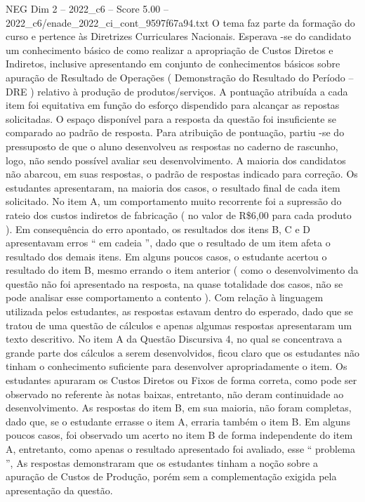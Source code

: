 \begin{textsample}{NEG Dim 2 – 2022\_c6 – Score 5.00 – 2022\_c6/enade\_2022\_ci\_cont\_9597f67a94.txt}
O tema faz parte da formação do curso e pertence às Diretrizes Curriculares Nacionais.
Esperava -se do candidato um conhecimento básico de como realizar a apropriação de Custos Diretos e Indiretos, inclusive apresentando em conjunto de conhecimentos básicos sobre apuração de Resultado de Operações ( Demonstração do Resultado do Período – DRE ) relativo à produção de produtos/serviços.
A pontuação atribuída a cada item foi equitativa em função do esforço dispendido para alcançar as repostas solicitadas.
O espaço disponível para a resposta da questão foi insuficiente se comparado ao padrão de resposta.
Para atribuição de pontuação, partiu -se do pressuposto de que o aluno desenvolveu as respostas no caderno de rascunho, logo, não sendo possível avaliar seu desenvolvimento.
A maioria dos candidatos não abarcou, em suas respostas, o padrão de respostas indicado para correção.
Os estudantes apresentaram, na maioria dos casos, o resultado final de cada item solicitado.
No item A, um comportamento muito recorrente foi a supressão do rateio dos custos indiretos de fabricação ( no valor de R\$6,00 para cada produto ).
Em consequência do erro apontado, os resultados dos itens B, C e D apresentavam erros “ em cadeia ”, dado que o resultado de um item afeta o resultado dos demais itens.
Em alguns poucos casos, o estudante acertou o resultado do item B, mesmo errando o item anterior ( como o desenvolvimento da questão não foi apresentado na resposta, na quase totalidade dos casos, não se pode analisar esse comportamento a contento ).
Com relação à linguagem utilizada pelos estudantes, as respostas estavam dentro do esperado, dado que se tratou de uma questão de cálculos e apenas algumas respostas apresentaram um texto descritivo.
No item A da Questão Discursiva 4, no qual se concentrava a grande parte dos cálculos a serem desenvolvidos, ficou claro que os estudantes não tinham o conhecimento suficiente para desenvolver apropriadamente o item.
Os estudantes apuraram os Custos Diretos ou Fixos de forma correta, como pode ser observado no referente às notas baixas, entretanto, não deram continuidade ao desenvolvimento.
As respostas do item B, em sua maioria, não foram completas, dado que, se o estudante errasse o item A, erraria também o item B.
Em alguns poucos casos, foi observado um acerto no item B de forma independente do item A, entretanto, como apenas o resultado apresentado foi avaliado, esse “ problema ”, As respostas demonstraram que os estudantes tinham a noção sobre a apuração de Custos de Produção, porém sem a complementação exigida pela apresentação da questão.

\end{textsample}
